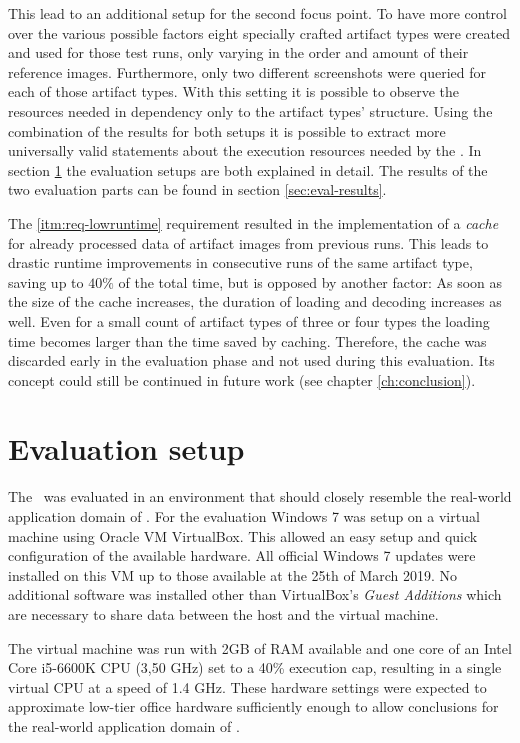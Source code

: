 This lead to an additional setup for the second focus point. To have more control over the various possible factors eight specially crafted artifact types were created and used for those test runs, only varying in the order and amount of their reference images. Furthermore, only two different screenshots were queried for each of those artifact types. With this setting it is possible to observe the resources needed in dependency only to the artifact types' structure. Using the combination of the results for both setups it is possible to extract more universally valid statements about the execution resources needed by the \vd. In section \ref{sec:eval-env} the evaluation setups are both explained in detail. The results of the two evaluation parts can be found in section \ref{sec:eval-results}.

The \ref{itm:req-lowruntime} requirement resulted in the implementation of a \emph{cache} for already processed data of artifact images from previous runs. This leads to drastic runtime improvements in consecutive runs of the same artifact type, saving up to $40\%$ of the total time, but is opposed by another factor: As soon as the size of the cache increases, the duration of loading and decoding increases as well. Even for a small count of artifact types of three or four types the loading time becomes larger than the time saved by caching. Therefore, the cache was discarded early in the evaluation phase and not used during this evaluation. Its concept could still be continued in future work (see chapter \ref{ch:conclusion}).

\section{Evaluation setup}\label{sec:eval-env}

The \vd~was evaluated in an environment that should closely resemble the real-world application domain of \ape. For the evaluation Windows 7 was setup on a virtual machine using Oracle VM VirtualBox\cite{virtualbox}. This allowed an easy setup and quick configuration of the available hardware. All official Windows 7 updates were installed on this VM up to those available at the 25th of March 2019. No additional software was installed other than VirtualBox's \emph{Guest Additions} which are necessary to share data between the host and the virtual machine.

The virtual machine was run with 2GB of RAM available and one core of an Intel Core i5-6600K CPU (3,50 GHz) set to a 40\% execution cap, resulting in a single virtual CPU at a speed of 1.4 GHz. These hardware settings were expected to approximate low-tier office hardware sufficiently enough to allow conclusions for the real-world application domain of \ape.

